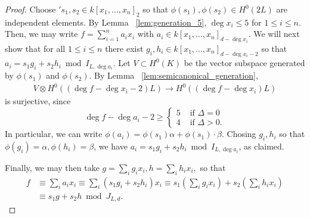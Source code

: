 \documentclass{amsart}
\theoremstyle{plain}
\theoremstyle{definition}
\theoremstyle{remark}
\numberwithin{equation}{section}
\begin{document}
\begin{proof}
Choose $'s_1,s_2 \in k[x_1, \ldots, x_n]_2$ so that $\phi(s_1),\phi(s_2) \in H^0(2L)$ are independent elements.
By Lemma ~\ref{lem:generation_5}, $\deg x_i \leq 5$ for $1 \leq i \leq n$. Then, we may write $f = \sum_{i = 1}^{n}a_i x_i$ with $a_i \in k[x_1, \ldots, x_n]_{d-\deg x_i}$.
We will next show that for all $1 \leq i \leq n$ there exist $g_i, h_i \in k[x_1, \ldots, x_n]_{d - \deg x_i - 2}$ so that $a_i = s_1g_i + s_2h_i \bmod I_{L,\deg a_i}.$ 
Let $V \subset H^0(K)$ be the vector subspace generated by $\phi(s_1)$ and $\phi(s_2)$. By Lemma ~\ref{lem:semicanonical_generation},
\begin{align*}
	V \otimes H^0((\deg f-\deg x_i -2)L) \rightarrow H^0((\deg f-\deg x_i)L)
\end{align*}
is surjective, since
$$
\deg f- \deg a_i -2 \geq \begin{cases}
	5 &\text{ if }\Delta = 0\\
	4 &\text{ if }\Delta > 0.
\end{cases}$$
In particular, we can write $\phi(a_i) = \phi(s_1) \alpha + \phi(s_1) \cdot \beta$. Chosing $g_i,h_i$ so that $\phi(g_i) = \alpha,\phi(h_i) = \beta$, we have $a_i = s_1 g_i + s_2 h_i \bmod I_{L,\deg a_i}$, as claimed.

Finally, we may then take $g = \sum_{i}^{}g_i x_i,h = \sum_{i}^{}h_i x_i,$ so that 
\begin{align*}
	f &\equiv \sum_{i}^{}a_i x_i \equiv \sum_{i}^{}(s_1g_i + s_2h_i)x_i \equiv s_1 \left( \sum_{i}^{}g_i x_i \right) + s_2 \left( \sum_{i}^{}h_i x_i \right) \\
	&\equiv s_1 g + s_2 h \bmod J_{L,d}.
\end{align*}
\end{proof}
\end{document}
